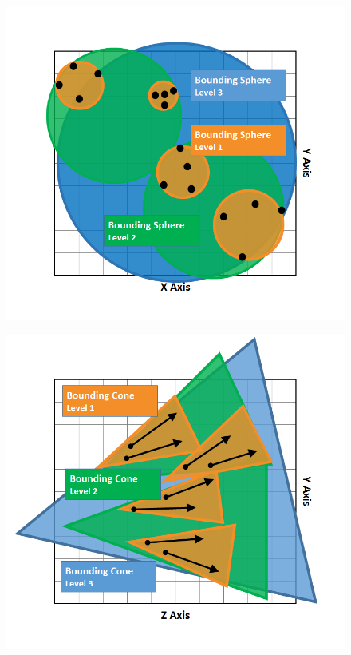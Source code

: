 \documentclass{llncs}
\begin{document}
\begin{figure}
\centering
\begin{minipage}{.5\textwidth}
  \centering
  \includegraphics[width=.85\linewidth]{images/figure 12.png}
  \label{fig:bounding-spheres}
\end{minipage}%
\begin{minipage}{.5\textwidth}
  \centering
  \includegraphics[width=.85\linewidth]{images/figure 13.png}
  \label{fig:bounding-cones}
\end{minipage}
\end{figure}
\end{document}
